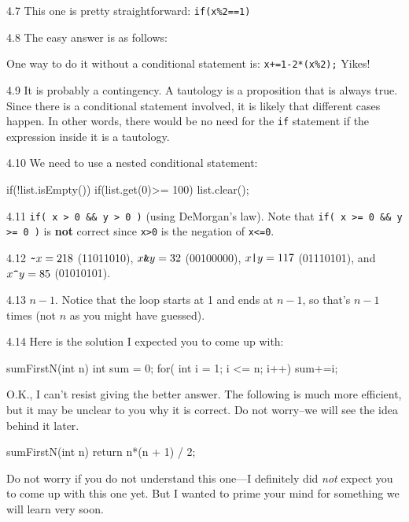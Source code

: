 \begin{RequAnswer}{4.7}
This one is pretty straightforward: \verb+if(x%2==1)+
\end{RequAnswer}
\begin{RequAnswer}{4.8}
The easy answer is as follows:
One way to do it without a conditional statement is: \verb^x+=1-2*(x%2);^ Yikes!
\end{RequAnswer}
\begin{RequAnswer}{4.9}
It is probably a contingency.
A tautology is a proposition that is always true. Since there is a conditional statement involved, it is likely that different cases happen.
In other words, there would be no need for the \verb+if+ statement if the expression inside it is a tautology.
\end{RequAnswer}
\begin{RequAnswer}{4.10}
We need to use a nested conditional statement:
\begin{code}
if(!list.isEmpty()) {
    if(list.get(0)>= 100) {
        list.clear();
    }
}
\end{code}
\end{RequAnswer}
\begin{RequAnswer}{4.11}
\verb+if( x > 0 && y > 0 )+ (using DeMorgan's law). Note that
\verb+if( x >= 0 && y >= 0 )+ is {\bf not} correct since \verb+x>0+ is the negation of \verb+x<=0+.
\end{RequAnswer}
\begin{RequAnswer}{4.12}
$\verb+~+x = 218$   (11011010),
$x \verb+&+ y = 32$ (00100000),
$x \verb+|+ y = 117$ (01110101), and
$x \verb+^+ y = 85$ (01010101).
\end{RequAnswer}
\begin{RequAnswer}{4.13}
$n-1$. Notice that the loop starts at 1 and ends at $n-1$, so that's $n-1$ times
(not $n$ as you might have guessed).
\end{RequAnswer}
\begin{RequAnswer}{4.14}
Here is the solution I expected you to come up with:
\begin{code}
sumFirstN(int n) {
	int sum = 0;
	for( int i = 1; i <= n; i++) {
		sum+=i;
	}
}
\end{code}
O.K., I can't resist giving the better answer. The following is much more efficient, but it may
be unclear to you why it is correct. Do not worry--we will see the idea behind it later.
\begin{code}
sumFirstN(int n) {
	return n*(n + 1) / 2;
}
\end{code}
Do not worry if you do not understand this one---I
definitely did {\em not} expect you to come up with this one yet.
But I wanted to prime your mind for something we will learn very soon.
\end{RequAnswer}
